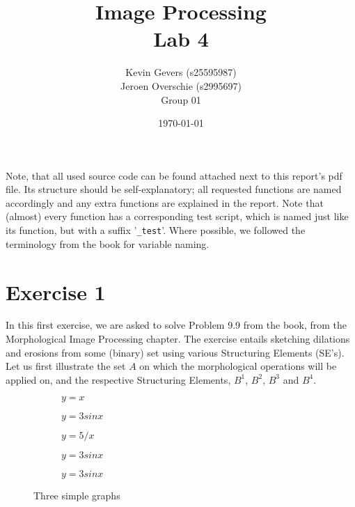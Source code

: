 \documentclass{article}
\title{Image Processing\\
    Lab 4}
\author{Kevin Gevers (s25595987) \\ Jeroen Overschie (s2995697)\\Group 01}
\date{\today}
\begin{document}
\maketitle

Note, that all used source code can be found attached next to this report's pdf file. Its structure should be self-explanatory; all requested functions are named accordingly and any extra functions are explained in the report. Note that (almost) every function has a corresponding test script, which is named just like its function, but with a suffix '\texttt{\_test}'. Where possible, we followed the terminology from the book \citep{gonzalez2008digital} for variable naming.

\section*{Exercise 1}
In this first exercise, we are asked to solve Problem 9.9 from the book, from the Morphological Image Processing chapter. The exercise entails sketching dilations and erosions from some (binary) set using various Structuring Elements (SE's). Let us first illustrate the set $A$ on which the morphological operations will be applied on, and the respective Structuring Elements, $B^1$, $B^2$, $B^3$ and $B^4$.

\begin{figure}
     \centering
     \begin{subfigure}[b]{0.19\textwidth}
         \centering
         
         \caption{$y=x$}
         \label{fig:y equals x}
     \end{subfigure}
     \hfill
     \begin{subfigure}[b]{0.19\textwidth}
         \centering
         
         \caption{$y=3sinx$}
         \label{fig:SE_B1}
     \end{subfigure}
     \hfill
     \begin{subfigure}[b]{0.19\textwidth}
         \centering
         
         \caption{$y=5/x$}
         \label{fig:SE_B2}
     \end{subfigure}
     \hfill
     \begin{subfigure}[b]{0.19\textwidth}
         \centering
         
         \caption{$y=3sinx$}
         \label{fig:SE_B3}
     \end{subfigure}
     \hfill
     \begin{subfigure}[b]{0.19\textwidth}
         \centering
         
         \caption{$y=3sinx$}
         \label{fig:SE_B4}
     \end{subfigure}
     
    \caption{Three simple graphs}
    \label{fig:three graphs}
\end{figure}
\end{document}
